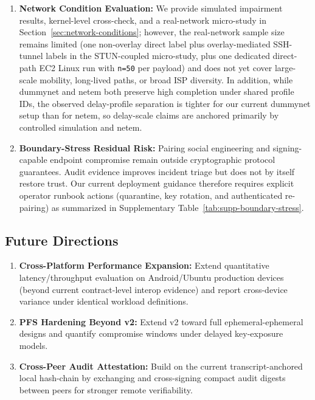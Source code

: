 \documentclass[10pt,journal,compsoc]{IEEEtran}
\begin{document}
\begin{enumerate}
  iOS/macOS, Android, and Ubuntu (suite-catalog parity, wire endianness,
  signature-selection contract, timeout-blocked fallback, cooldown guard,
  and trust-pinning path; Supplementary
  Table~\ref{tab:supp-cross-platform-contract}) and measured external
  Linux rows (direct + tunnel labels; Supplementary
  Table~\ref{tab:supp-interop-matrix}). However, absolute
  latency/throughput numbers in the main performance tables remain
  Apple-centric and should not be transferred to broad non-Apple
  deployments without remeasurement.
\item
  \textbf{Network Condition Evaluation:} We provide simulated impairment
  results, kernel-level cross-check, and a real-network micro-study in
  Section~\ref{sec:network-conditions}; however, the real-network sample
  size remains limited (one non-overlay direct label plus overlay-mediated
  SSH-tunnel labels in the STUN-coupled micro-study, plus one dedicated
  direct-path EC2 Linux run with \texttt{n=50} per payload) and does not
  yet cover large-scale mobility,
  long-lived paths, or broad ISP diversity. In addition, while dummynet
  and netem both preserve high completion under shared profile IDs, the
  observed delay-profile separation is tighter for our current dummynet
  setup than for netem, so delay-scale claims are anchored primarily by
  controlled simulation and netem.
\item
  \textbf{Boundary-Stress Residual Risk:} Pairing social engineering and
  signing-capable endpoint compromise remain outside cryptographic
  protocol guarantees. Audit evidence improves incident triage but does
  not by itself restore trust. Our current deployment guidance therefore
  requires explicit operator runbook actions (quarantine, key rotation,
  and authenticated re-pairing) as summarized in Supplementary
  Table~\ref{tab:supp-boundary-stress}.
\end{enumerate}

\subsection{Future Directions}\label{b.-future-directions}

\begin{enumerate}
\item
  \textbf{Cross-Platform Performance Expansion:} Extend quantitative
  latency/throughput evaluation on Android/Ubuntu production devices
  (beyond current contract-level interop evidence) and report
  cross-device variance under identical workload definitions.
\item
  \textbf{PFS Hardening Beyond v2:} Extend v2 toward full
  ephemeral-ephemeral designs and quantify compromise windows under
  delayed key-exposure models.
\item
  \textbf{Cross-Peer Audit Attestation:} Build on the current
  transcript-anchored local hash-chain by exchanging and cross-signing
  compact audit digests between peers for stronger remote verifiability.
\end{enumerate}
\end{document}
